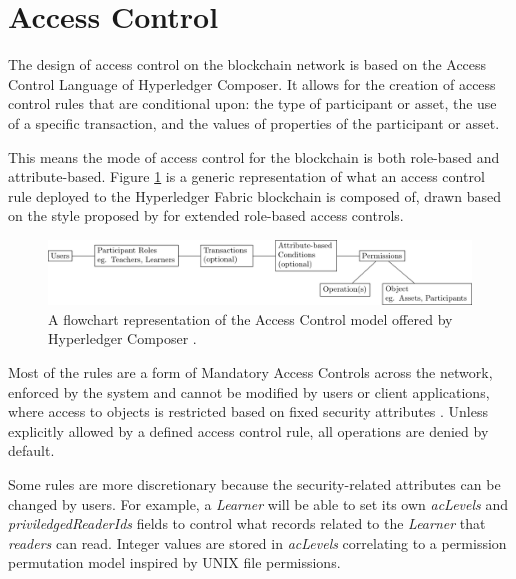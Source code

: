 \section{Access Control}
The design of access control on the blockchain network is based on the Access Control Language of Hyperledger Composer.
It allows for the creation of access control rules that are conditional upon: the type of participant or asset,
the use of a specific transaction, and the values of properties of the participant or asset.

This means the mode of access control for the blockchain is both role-based and attribute-based.
Figure \ref{fig:ac_model} is a generic representation of what an access control rule deployed to the Hyperledger Fabric blockchain is composed of,
drawn based on the style proposed by \citet{poniszewska2005representation} for extended role-based access controls.\\

\begin{figure}[!ht]
	\centering
	\includegraphics[width=1.0\textwidth]{ac_model}
	\caption[Access Control Model of Hyperledger Composer]
	{A flowchart representation of the Access Control model offered by Hyperledger Composer \citep{official2018composer}.}
	\label{fig:ac_model}
\end{figure}

Most of the rules are a form of Mandatory Access Controls across the network, enforced by the system and cannot be modified by
users or client applications, where access to objects is restricted based on fixed security attributes \citep{yuan2005attributed}.
Unless explicitly allowed by a defined access control rule, all operations are denied by default.

Some rules are more discretionary because the security-related attributes can be changed by users.
For example, a \textit{Learner} will be able to set its own \textit{acLevels} and \textit{priviledgedReaderIds} fields to control
what records related to the \textit{Learner} that \textit{readers} can read. Integer values are stored in \textit{acLevels} correlating to
a permission permutation model inspired by UNIX file permissions.


